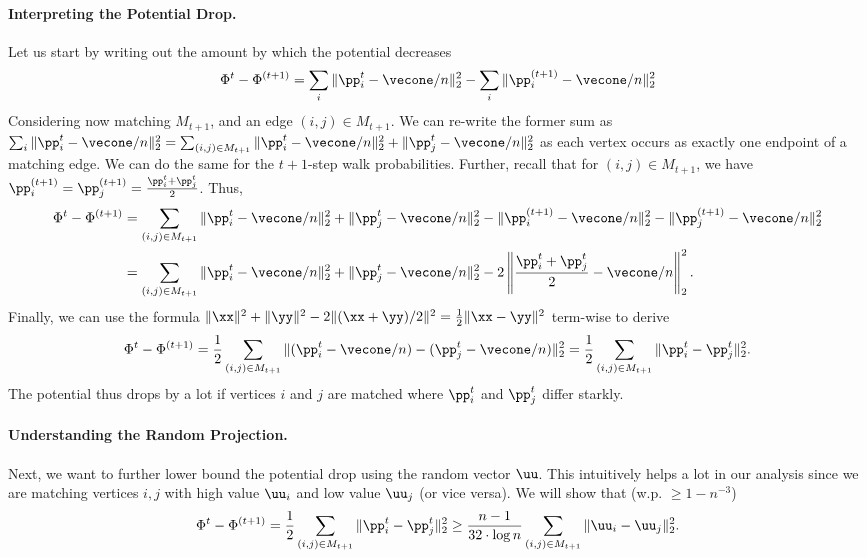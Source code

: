 \paragraph{Interpreting the Potential Drop.} Let us start by writing out the amount by which the potential decreases 
\begin{align*}
     \Phi^{t} - \Phi^{(t+1)} = \sum_{i} \|\pp_{i}^t -\vecone/n\|_2^2 - \sum_{i} \|\pp_{i}^{(t+1)} -\vecone/n\|_2^2
\end{align*}
Considering now matching $M_{t+1}$,  and an edge $(i,j) \in M_{t+1}$. We can re-write the former sum as $\sum_{i} \|\pp_{i}^t -\vecone/n\|_2^2 = \sum_{(i,j) \in M_{t+1}} \|\pp_{i}^t -\vecone/n\|_2^2 + \|\pp_{j}^t -\vecone/n\|_2^2$ as each vertex occurs as exactly one endpoint of a matching edge. We can do the same for the $t+1$-step walk probabilities. Further, recall that for $(i,j) \in M_{t+1}$, we have $\pp_i^{(t+1)} = \pp_j^{(t+1)} = \frac{\pp_i^t+ \pp_j^t}{2}$. Thus,
\begin{align*}
     \Phi^{t} - \Phi^{(t+1)} &= \sum_{(i,j) \in M_{t+1}}  \|\pp_{i}^t -\vecone/n\|_2^2 + \|\pp_{j}^t -\vecone/n\|_2^2 -  \|\pp_{i}^{(t+1)} -\vecone/n\|_2^2 - \|\pp_{j}^{(t+1)} -\vecone/n\|_2^2\\
     &= \sum_{(i,j)\in M_{t+1}}  \|\pp_{i}^t -\vecone/n\|_2^2 + \|\pp_{j}^t -\vecone/n\|_2^2 - 2 \left\|\frac{\pp_i^t+ \pp_j^t}{2} - \vecone/n \right\|_2^2.
\end{align*}
Finally, we can use the formula $\|\xx\|^2 + \|\yy\|^2 - 2 \|(\xx + \yy)/2\|^2 = \frac{1}{2} \| \xx - \yy\|^2$ term-wise to derive 
\begin{align*}
     \Phi^{t} - \Phi^{(t+1)} = \frac{1}{2}\sum_{(i,j) \in M_{t+1}} \|(\pp_{i}^t -\vecone/n) - (\pp_{j}^t -\vecone/n)\|_2^2 = \frac{1}{2}\sum_{(i,j) \in M_{t+1}} \|\pp_{i}^t - \pp_{j}^t \|_2^2.
\end{align*}
The potential thus drops by a lot if vertices $i$ and $j$ are matched where $\pp_{i}^t$ and $\pp_{j}^t$ differ starkly.

\paragraph{Understanding the Random Projection.} Next, we want to further lower bound the potential drop using the random vector $\uu$. This intuitively helps a lot in our analysis since we are matching vertices $i,j$ with high value $\uu_i$ and low value $\uu_j$ (or vice versa). We will show that (w.p. $\geq 1-n^{-3}$)
\begin{align}\label{eq:cutMatchingAnalysis}
     \Phi^{t} - \Phi^{(t+1)} = \frac{1}{2} \sum_{(i,j) \in M_{t+1}} \|\pp_{i}^t - \pp_{j}^t \|_2^2 \geq \frac{n-1}{32 \cdot \log n} \sum_{(i,j) \in M_{t+1}} \|\uu_i - \uu_j\|^2_2.
\end{align}

